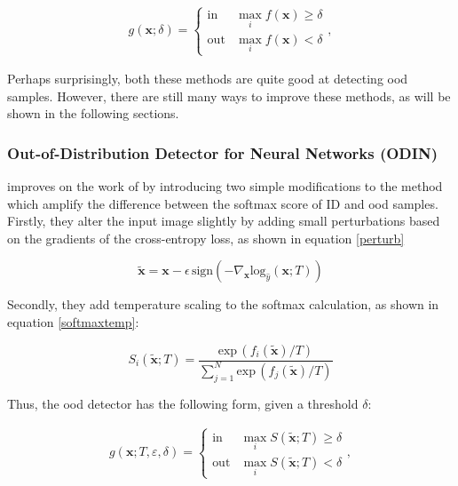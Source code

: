 \documentclass[UKenglish]{uiomasterthesis} %
\theoremstyle{definition}
\begin{document}
\begin{align}
\label{eq:msp}
    g(\bm{x}; \delta)=\begin{cases} 
        \text{in } & \max_i f(\bm{x})\ge \delta \\
        \text{out} & \max_i f(\bm{x}) < \delta 
   \end{cases},
\end{align}

Perhaps surprisingly, both these methods are quite good at detecting \ac{ood} samples. However, there are still many ways to improve these methods, as will be shown in the following sections.
\\

\subsubsection{Out-of-Distribution Detector for Neural Networks (ODIN)} \label{ood_odin}

\cite{odin} improves on the work of \cite{oodbaseline} by introducing two simple modifications to the method which amplify the difference between the softmax score of ID and \ac{ood} samples. Firstly, they alter the input image slightly by adding small perturbations based on the gradients of the cross-entropy loss, as shown in equation \ref{perturb}

\begin{equation}
\tilde{\bm{x}} = \bm{x} - \epsilon \, \text{sign}(-\nabla_{\bm{x}} \text{log}_{\hat{y}}(\bm{x};T))
\label{perturb}
\end{equation}

Secondly, they add temperature scaling to the softmax calculation, as shown in equation \ref{softmaxtemp}:

\begin{equation}
S_i(\tilde{\bm{x}} ; T) = \frac{\text{exp} \, (f_i(\tilde{\bm{x}})/T)}{\sum^N_{j=1} \text{exp} \, (f_j(\tilde{\bm{x}})/T)}
\label{softmaxtemp}
\end{equation}

Thus, the \ac{ood} detector has the following form, given a threshold $\delta$:

\begin{align}
    g(\bm{x}; T, \varepsilon, \delta)=\begin{cases} 
        \text{in } & \max_{i}S(\tilde{\bm{x}};T) \ge \delta \\
        \text{out} & \max_{i}S(\tilde{\bm{x}};T) < \delta 
   \end{cases},
\label{eq:fullodin}
\end{align}
\end{document}
